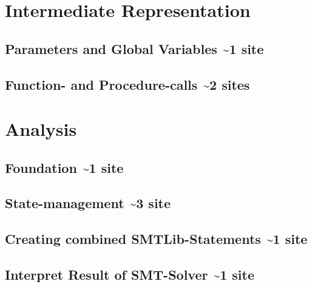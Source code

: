 \section{Intermediate Representation}
\subsection{Parameters and Global Variables \textasciitilde 1 site}
\subsection{Function- and Procedure-calls \textasciitilde 2 sites}
\section{Analysis}
\subsection{Foundation \textasciitilde 1 site}
\subsection{State-management \textasciitilde 3 site}
\subsection{Creating combined SMTLib-Statements \textasciitilde 1 site}
\subsection{Interpret Result of SMT-Solver \textasciitilde 1 site}
